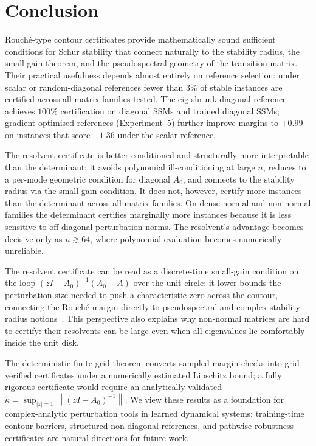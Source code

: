 \documentclass{article}
\theoremstyle{definition}
\newcommand{\norm}[1]{\left\|#1\right\|}
\begin{document}
\section{Conclusion}
\label{sec:conclusion}

Rouch\'e-type contour certificates provide mathematically sound sufficient
conditions for Schur stability that connect naturally to the stability radius,
the small-gain theorem, and the pseudospectral geometry of the transition
matrix.  Their practical usefulness depends almost entirely on reference
selection: under scalar or random-diagonal references fewer than $3\%$ of
stable instances are certified across all matrix families tested.  The
eig-shrunk diagonal reference achieves $100\%$ certification on diagonal SSMs
and trained diagonal SSMs; gradient-optimised references (Experiment~5)
further improve margins to $+0.99$ on instances that score $-1.36$ under
the scalar reference.

The resolvent certificate is better conditioned and structurally more
interpretable than the determinant: it avoids polynomial ill-conditioning at
large $n$, reduces to a per-mode geometric condition for diagonal $A_0$, and
connects to the stability radius via the small-gain condition.  It does not,
however, certify more instances than the determinant across all matrix families.
On dense normal and non-normal families the determinant certifies marginally more
instances because it is less sensitive to off-diagonal perturbation norms.
The resolvent's advantage becomes decisive only as $n \gtrsim 64$, where
polynomial evaluation becomes numerically unreliable.

The resolvent certificate can be read as a discrete-time small-gain condition on
the loop $(zI-A_0)^{-1}(A_0 - A)$ over the unit circle: it lower-bounds the
perturbation size needed to push a characteristic zero across the contour,
connecting the Rouch\'e margin directly to pseudospectral and complex
stability-radius notions~\cite{hinrichsen1986stability,trefethen2005spectra}.
This perspective also explains why non-normal matrices are hard to certify:
their resolvents can be large even when all eigenvalues lie comfortably inside
the unit disk.

The deterministic finite-grid theorem converts sampled margin checks into
grid-verified certificates under a numerically estimated Lipschitz bound;
a fully rigorous certificate would require an analytically validated
$\kappa = \sup_{|z|=1}\norm{(zI-A_0)^{-1}}$.  We view these results as a
foundation for complex-analytic perturbation tools in learned dynamical
systems: training-time contour barriers, structured non-diagonal references,
and pathwise robustness certificates are natural directions for future work.
\end{document}

